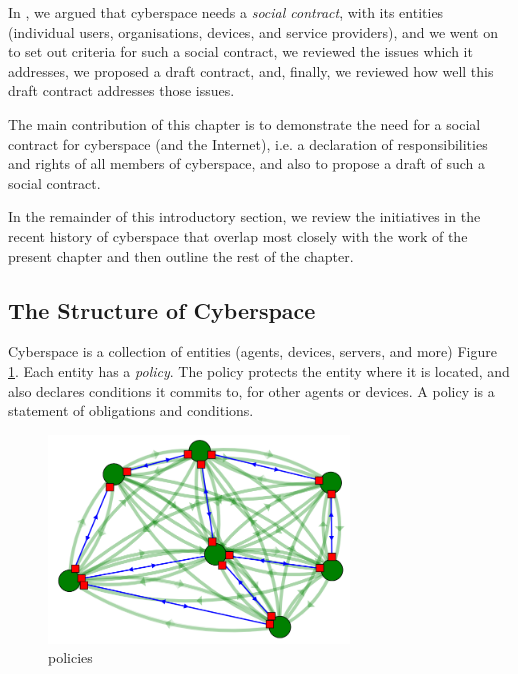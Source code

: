 In \cite{sheniar2021social}, we argued that cyberspace needs a {\em
social contract}, with its entities (individual users, organisations,
devices, and service providers), and we went on to set out criteria
for such a social contract, we reviewed the issues which it addresses,
we proposed a draft contract, and, finally, we reviewed how well this
draft contract addresses those issues.


The main contribution of this chapter is to demonstrate the need for a
social contract for cyberspace (and the Internet), i.e. a declaration
of responsibilities and rights of all members of cyberspace, and also
to propose a draft of such a social contract.

In the remainder of this introductory section, we review the initiatives
in the recent history of cyberspace that overlap most closely with the
work of the present chapter and then outline the rest of the chapter.

\subsection{The Structure of Cyberspace}\label{strcofcyb}

Cyberspace is a collection of entities (agents,
devices, servers, and more) Figure \ref{policiesfig}. Each entity has
a {\em policy}. The policy protects the entity where it is located, and
also declares conditions it commits to, for other agents or devices. A
policy is a statement of obligations and conditions.


\begin{figure}
	\centering
		\includegraphics[width=8cm]{figures/policies.png}
\caption{policies}
\label{policiesfig}
\end{figure}

